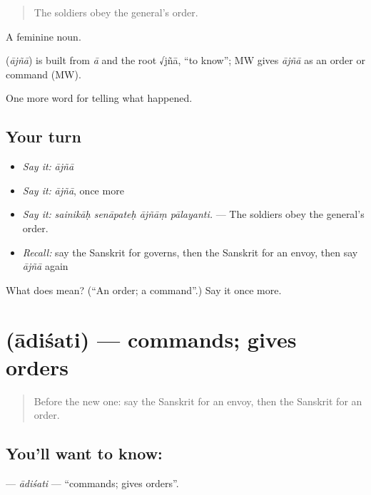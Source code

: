 \begin{quote}
The soldiers obey the general's order.
\end{quote}

A feminine noun.

\begin{cousinweb}
\textbf{} (\emph{ājñā}) is built from \emph{ā} and the root √jñā, \textquotedblleft{}to know\textquotedblright{}; MW gives \emph{ājñā} as an order or command (MW).
\end{cousinweb}

\begin{grammarlens}[title={What you've built}]
One more word for telling what happened.
\end{grammarlens}

\subsection*{Your turn}
\begin{itemize}
\raggedright
  \item \emph{Say it:} \emph{ājñā}
  \item \emph{Say it:} \emph{ājñā}, once more
  \item \emph{Say it:} \emph{sainikāḥ senāpateḥ ājñāṃ pālayanti.} — The soldiers obey the general's order.
  \item \emph{Recall:} say the Sanskrit for governs, then the Sanskrit for an envoy, then say \emph{ājñā} again
\end{itemize}

\begin{tcolorbox}[breakable,colback=teal!4,colframe=teal!35!black,title={Before you move on}]
What does  mean? (\textquotedblleft{}An order; a command\textquotedblright{}.) Say it once more.
\end{tcolorbox}
\section[\texorpdfstring{\sk{आदिशति} (ādiśati)}{आदिशति (ādiśati)}]{ (ādiśati) — commands; gives orders}

\label{lesson:SA-C317-adisati}



\begin{quote}
Before the new one: say the Sanskrit for an envoy, then the Sanskrit for an order.
\end{quote}

\subsection*{You'll want to know: }
\textbf{} — \emph{ādiśati} — \textquotedblleft{}commands; gives orders\textquotedblright{}.

